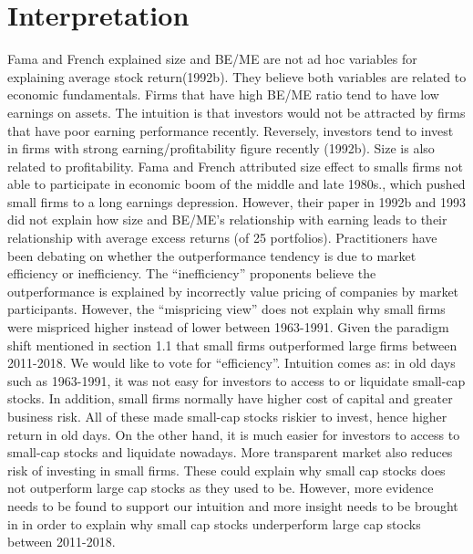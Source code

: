 \documentclass[12pt]{article}
\begin{document}
\section{Interpretation}

Fama and French explained size and BE/ME are not ad hoc variables for explaining average stock return(1992b). They believe both variables are related to economic fundamentals. Firms that have high BE/ME ratio tend to have low earnings on assets. The intuition is that investors would not be attracted by firms that have poor earning performance recently. Reversely, investors tend to invest in firms with strong earning/profitability figure recently (1992b). Size is also related to profitability. Fama and French attributed size effect to smalls firms not able to participate in economic boom of the middle and late 1980s., which pushed small firms to a long earnings depression. However, their paper in 1992b and 1993 did not explain how size and BE/ME’s relationship with earning leads to their relationship with average excess returns (of 25 portfolios).
Practitioners have been debating on whether the outperformance tendency is due to market efficiency or inefficiency. The “inefficiency” proponents believe the outperformance is explained by incorrectly value pricing of companies by market participants. However, the “mispricing view” does not explain why small firms were mispriced higher instead of lower between 1963-1991. 
Given the paradigm shift mentioned in section 1.1 that small firms outperformed large firms between 2011-2018. We would like to vote for “efficiency”. Intuition comes as: in old days such as 1963-1991, it was not easy for investors to access to or liquidate small-cap stocks. In addition, small firms normally have higher cost of capital and greater business risk. All of these made small-cap stocks riskier to invest, hence higher return in old days. On the other hand, it is much easier for investors to access to small-cap stocks and liquidate nowadays. More transparent market also reduces risk of investing in small firms. These could explain why small cap stocks does not outperform large cap stocks as they used to be. However, more evidence needs to be found to support our intuition and more insight needs to be brought in in order to explain why small cap stocks underperform large cap stocks between 2011-2018.
\end{document}
